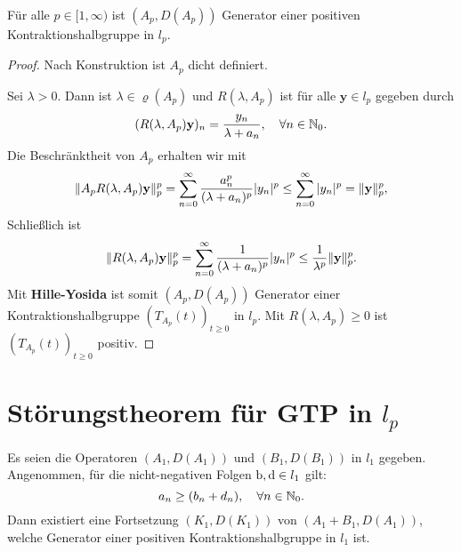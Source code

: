 \begin{prop}\label{A_p Generator einer Kontraktionshalbgruppe}
Für alle $p\in[1,\infty)$ ist $(A_p, D(A_p))$ Generator einer positiven Kontraktionshalbgruppe in $l_p$.
\end{prop}

\begin{proof}
\par 
Nach Konstruktion ist $A_p$ dicht definiert. 

\par
Sei $\lambda>0$. Dann ist $\lambda\in \varrho(A_p)$ und $R(\lambda, A_p)$ ist für alle $\textbf{y}\in l_p$ gegeben durch
\begin{equation*}
(R(\lambda, A_p)\textnormal{\index{}\textbf y})_n = \frac{y_n}{\lambda + a_n},\quad \forall n\in\N_0.
\end{equation*}
Die Beschränktheit von $A_p$ erhalten wir mit
\begin{equation*}
\|A_pR(\lambda, A_p)\textnormal{\index{}\textbf y}\|_p^p = \sum_{n=0}^\infty \frac{a_n^p}{(\lambda +  a_n)^p}|y_n|^p\leq\sum_{n=0}^\infty |y_n|^p=\|\textbf{y}\|_p^p,
\end{equation*}
Schließlich ist
\begin{equation*}
\|R(\lambda, A_p)\textnormal{\index{}\textbf y}\|_p^p = \sum_{n=0}^\infty \frac{1}{(\lambda + a_n)^p}|y_n|^p \leq \frac{1}{\lambda^p}\|\textnormal{\index{}\textbf y}\|_p^p.
\end{equation*}
Mit \textbf{Hille-Yosida} ist somit $(A_p, D(A_p))$ Generator einer Kontraktionshalbgruppe $(T_{A_p}(t))_{t\geq0}$ in $l_p$. Mit $R(\lambda, A_p)\geq0$ ist $(T_{A_p}(t))_{t\geq0}$ positiv.
\end{proof}

\section{Störungstheorem für GTP in $l_p$}

\begin{fsatz}
Es seien die Operatoren  $(A_1, D(A_1))$ und  $(B_1, D(B_1))$ in $l_1$ gegeben. Angenommen, für die nicht-negativen Folgen  $\textbf{\textnormal{b}},\textbf{\textnormal{d}}\in l_1$ gilt: 
\begin{equation*}
a_n\geq (b_n + d_n),\quad \forall n\in\mathbb{N}_0.
\end{equation*}
Dann existiert eine Fortsetzung $(K_1, D(K_1))$ von $(A_1+B_1, D(A_1))$, welche Generator einer positiven Kontraktionshalbgruppe in $l_1$ ist.
\end{fsatz}

